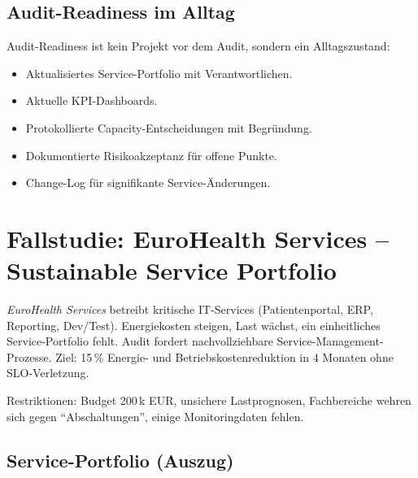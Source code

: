 \documentclass[11pt,a4paper,oneside]{article}
\begin{document}
\subsection{Audit-Readiness im Alltag}

Audit-Readiness ist kein Projekt vor dem Audit, sondern ein Alltagszustand:

\begin{itemize}
  \item Aktualisiertes Service-Portfolio mit Verantwortlichen.
  \item Aktuelle KPI-Dashboards.
  \item Protokollierte Capacity-Entscheidungen mit Begründung.
  \item Dokumentierte Risikoakzeptanz für offene Punkte.
  \item Change-Log für signifikante Service-Änderungen.
\end{itemize}

\section{Fallstudie: EuroHealth Services -- Sustainable Service Portfolio}

\emph{EuroHealth Services} betreibt kritische IT-Services (Patientenportal, ERP, Reporting, Dev/Test). Energiekosten steigen, Last wächst, ein einheitliches Service-Portfolio fehlt. Audit fordert nachvollziehbare Service-Management-Prozesse. Ziel: 15\,\% Energie- und Betriebskostenreduktion in 4 Monaten ohne SLO-Verletzung.

Restriktionen: Budget 200\,k EUR, unsichere Lastprognosen, Fachbereiche wehren sich gegen ``Abschaltungen'', einige Monitoringdaten fehlen.

\subsection{Service-Portfolio (Auszug)}
\end{document}
